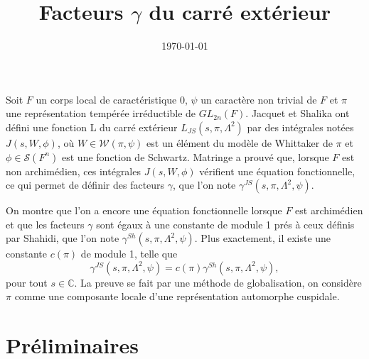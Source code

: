 \documentclass{amsart}
\begin{document}
\title{Facteurs $\gamma$ du carré extérieur}
\date{\today}
\maketitle

Soit $F$ un corps local de caractéristique $0$, $\psi$ un caractère non trivial de $F$ et $\pi$ une représentation tempérée irréductible de $GL_{2n}(F)$. Jacquet et Shalika ont défini une fonction L du carré extérieur $L_{JS}(s, \pi, \Lambda^2)$ par des intégrales notées $J(s, W, \phi)$, où $W \in \mathcal{W}(\pi, \psi)$ est un élément du modèle de Whittaker de $\pi$ et $\phi \in \mathcal{S}(F^n)$ est une fonction de Schwartz. Matringe a prouvé que, lorsque $F$ est non archimédien, ces intégrales $J(s,W,\phi)$ vérifient une équation fonctionnelle, ce qui permet de définir des facteurs $\gamma$, que l'on note $\gamma^{JS}(s,\pi,\Lambda^2,\psi)$. 

On montre que l'on a encore une équation fonctionnelle lorsque $F$ est archimédien et que les facteurs $\gamma$ sont égaux à une constante de module 1 prés à ceux définis par Shahidi, que l'on note $\gamma^{Sh}(s,\pi,\Lambda^2,\psi)$. Plus exactement, il existe une constante $c(\pi)$ de module 1, telle que
\begin{equation}
\gamma^{JS}(s,\pi,\Lambda^2,\psi)=c(\pi)\gamma^{Sh}(s,\pi,\Lambda^2,\psi),
\end{equation}
pour tout $s \in \mathbb{C}$. La preuve se fait par une méthode de globalisation, on considère $\pi$ comme une composante locale d'une représentation automorphe cuspidale.

\section{Préliminaires}
\end{document}
